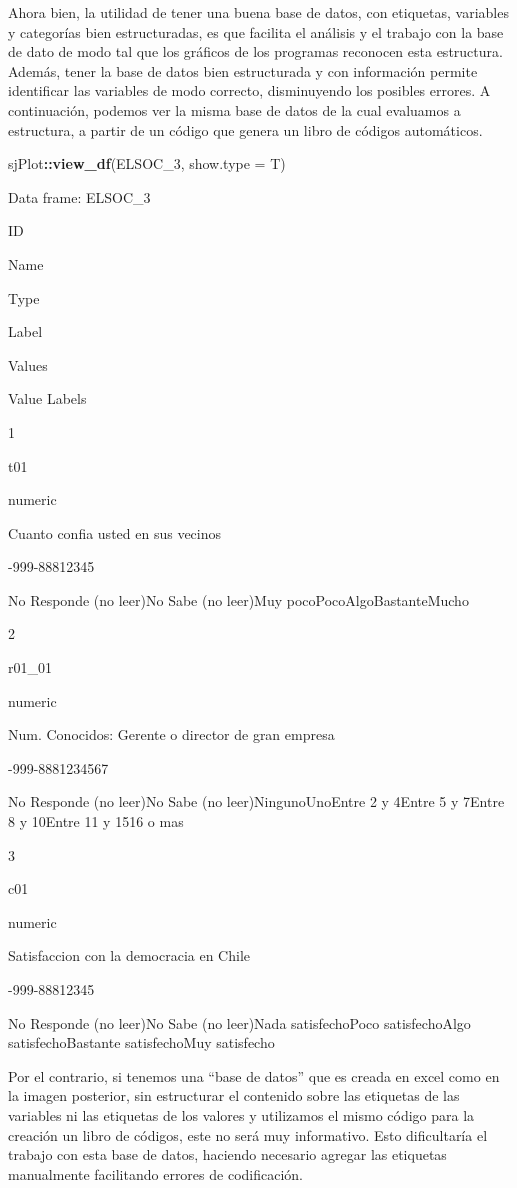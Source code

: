 \documentclass[
  14pt,
]{book}
\newenvironment{Shaded}{\begin{snugshade}}{\end{snugshade}}
\newcommand{\DataTypeTok}[1]{\textcolor[rgb]{0.13,0.29,0.53}{#1}}
\newcommand{\DecValTok}[1]{\textcolor[rgb]{0.00,0.00,0.81}{#1}}
\newcommand{\KeywordTok}[1]{\textcolor[rgb]{0.13,0.29,0.53}{\textbf{#1}}}
\newcommand{\NormalTok}[1]{#1}
\newcommand{\OperatorTok}[1]{\textcolor[rgb]{0.81,0.36,0.00}{\textbf{#1}}}
\begin{document}
Ahora bien, la utilidad de tener una buena base de datos, con etiquetas, variables y categorías bien estructuradas, es que facilita el análisis y el trabajo con la base de dato de modo tal que los gráficos de los programas reconocen esta estructura. Además, tener la base de datos bien estructurada y con información permite identificar las variables de modo correcto, disminuyendo los posibles errores. A continuación, podemos ver la misma base de datos de la cual evaluamos a estructura, a partir de un código que genera un libro de códigos automáticos.

\begin{Shaded}
\begin{Highlighting}[]
\NormalTok{sjPlot}\OperatorTok{::}\KeywordTok{view_df}\NormalTok{(ELSOC_}\DecValTok{3}\NormalTok{, }\DataTypeTok{show.type =}\NormalTok{ T)}
\end{Highlighting}
\end{Shaded}

Data frame: ELSOC\_3

ID

Name

Type

Label

Values

Value Labels

1

t01

numeric

Cuanto confia usted en sus vecinos

-999-88812345

No Responde (no leer)No Sabe (no leer)Muy pocoPocoAlgoBastanteMucho

2

r01\_01

numeric

Num. Conocidos: Gerente o director de gran empresa

-999-8881234567

No Responde (no leer)No Sabe (no leer)NingunoUnoEntre 2 y 4Entre 5 y 7Entre 8 y 10Entre 11 y 1516 o mas

3

c01

numeric

Satisfaccion con la democracia en Chile

-999-88812345

No Responde (no leer)No Sabe (no leer)Nada satisfechoPoco satisfechoAlgo satisfechoBastante satisfechoMuy satisfecho

Por el contrario, si tenemos una ``base de datos'' que es creada en excel como en la imagen posterior, sin estructurar el contenido sobre las etiquetas de las variables ni las etiquetas de los valores y utilizamos el mismo código para la creación un libro de códigos, este no será muy informativo. Esto dificultaría el trabajo con esta base de datos, haciendo necesario agregar las etiquetas manualmente facilitando errores de codificación.
\end{document}
